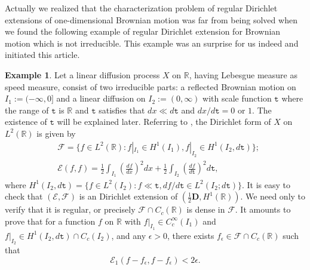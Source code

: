 \documentclass[a4paper]{amsart}
\theoremstyle{definition}
\newtheorem{example}[theorem]{Example}
\theoremstyle{remark}
\numberwithin{equation}{section}
\begin{document}
Actually we realized that the characterization problem of regular Dirichlet extensions of one-dimensional Brownian motion 
was far from being solved when we found the following example of regular Dirichlet extension for Brownian motion which is not irreducible.
This example was an surprise for us indeed and initiated this article. 

\begin{example} Let a linear diffusion process $X$ on $\mathbb{R}$, having Lebesgue measure as speed measure, consist of two irreducible parts: a reflected Brownian motion on $I_1:=(-\infty, 0]$ and a linear diffusion on $I_2:=(0,\infty)$ with scale function ${{\mathtt{t}}}$ where the range of ${{\mathtt{t}}}$ is $\mathbb{R}$ and ${{\mathtt{t}}}$ satisfies  that $dx\ll d{{\mathtt{t}}}$ and ${dx/d{{\mathtt{t}}}}=0$ or $1$. The existence of ${{\mathtt{t}}}$ will be explained later. Referring to \cite{FHY10}, the Dirichlet form of $X$ on $L^2(\mathbb{R})$ is given by
\[
\begin{aligned}
 &{{\mathcal{F}}}=\{f\in L^2(\mathbb{R}): f|_{I_1}\in H^1(I_1), f|_{I_2}\in H^1(I_2,d{{\mathtt{t}}})\};\\
&{{\mathcal{E}}}(f,f)=\frac{1}{2}\int_{I_1} \left({\frac{df}{dx}}\right)^2dx+\frac{1}{2}\int_{I_2}\left(\frac{df}{d{{\mathtt{t}}}}\right)^2 d{{\mathtt{t}}},
\end{aligned}\]
where $H^1(I_2,d{{\mathtt{t}}})=\{f\in L^2(I_2): f\ll {{\mathtt{t}}}, {df/d{{\mathtt{t}}}}\in L^2(I_2;d{{\mathtt{t}}})\}$.
It is easy to check that $({{\mathcal{E}}},{{\mathcal{F}}})$ is an Dirichlet extension of $(\frac{1}{2}\mathbf{D}, H^1(\mathbb{R}))$. We need only to verify that it is regular, or precisely ${{\mathcal{F}}}\cap C_c(\mathbb{R})$ is dense in ${{\mathcal{F}}}$. It amounts to prove that for a function $f$ on $\mathbb{R}$ with $f|_{I_1}\in C_c^\infty(I_1)$ and $f|_{I_2}\in H^1(I_2,d{{\mathtt{t}}})\cap C_c(I_2)$, and any $\epsilon>0$, there exists $f_{\epsilon}\in {{\mathcal{F}}}\cap C_c(\mathbb{R})$ such that
$${{\mathcal{E}}}_1(f-f_{\epsilon},f-f_{\epsilon})<2\epsilon.$$


\end{example}
\end{document}
